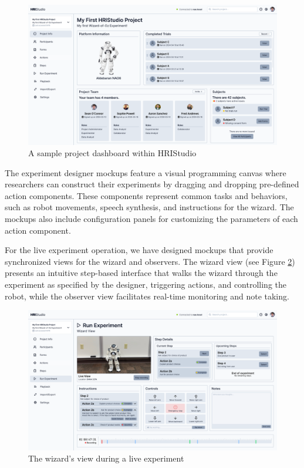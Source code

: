 \documentclass[letterpaper, 10 pt, conference]{ieeeconf}
\begin{document}
\begin{figure}[ht]
  \begin{center}
  	\includegraphics[width=0.4\paperwidth]{assets/mockups/projectdashboard}
    \caption{A sample project dashboard within HRIStudio}
  \end{center}
  \label{fig:dashboard}
\end{figure}

The experiment designer mockups feature a visual programming canvas where researchers can construct their experiments by dragging and dropping pre-defined action components. These components represent common tasks and behaviors, such as robot movements, speech synthesis, and instructions for the wizard. The mockups also include configuration panels for customizing the parameters of each action component.

For the live experiment operation, we have designed mockups that provide synchronized views for the wizard and observers. The wizard view (see  Figure \ref{fig:wizardview}) presents an intuitive step-based interface that walks the wizard through the experiment as specified by the designer, triggering actions, and controlling the robot, while the observer view facilitates real-time monitoring and note taking.

\begin{figure}[ht]
  \begin{center}
  	\includegraphics[width=0.4\paperwidth]{assets/mockups/wizardview}
    \caption{The wizard's view during a live experiment}
  \end{center}
  \label{fig:wizardview}
\end{figure}
\end{document}
